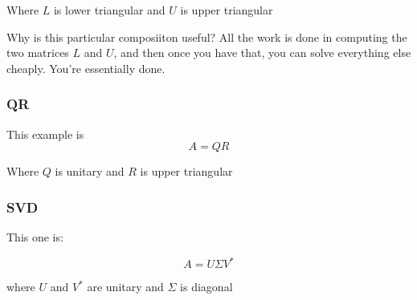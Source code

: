 \documentclass{article}
\begin{document}
Where $L$ is lower triangular and $U$ is upper triangular

Why is this particular composiiton useful?  All the work is done in computing the two matrices $L$ and $U$, and then once you have that, you can solve everything else cheaply. You're essentially done.

\subsubsection{QR}

This example is $$A = QR$$

Where $Q$ is unitary and $R$ is upper triangular

\subsubsection{SVD}

This one is:

$$A = U\Sigma V^*$$

where $U$ and $V^*$ are unitary and $\Sigma$ is diagonal
\end{document}
